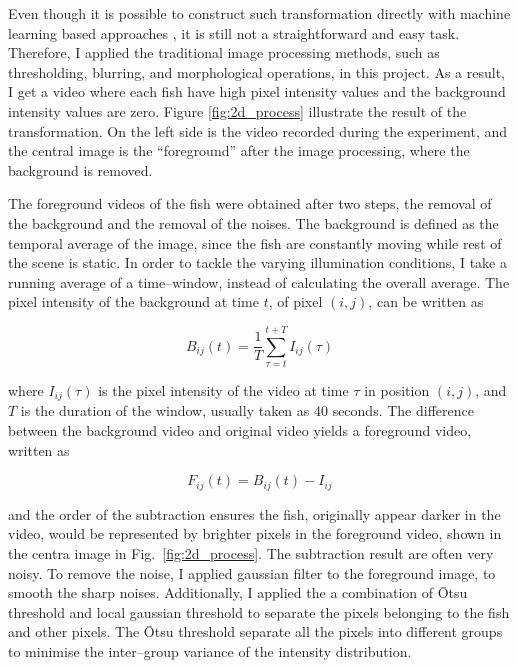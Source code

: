 \documentclass[11pt,twoside]{report}
\begin{document}
Even though it is possible to construct such transformation directly with machine learning based approaches \cite{newby2018}, it is still not a straightforward and easy task.
Therefore, I applied the traditional image processing methods, such as thresholding, blurring, and morphological operations, in this project.
As a result, I get a video where each fish have high pixel intensity values and the background intensity values are zero. Figure \ref{fig:2d_process} illustrate the result of the transformation. On the left side is the video recorded during the experiment, and the central image is the ``foreground'' after the image processing, where the background is removed.

The foreground videos of the fish were obtained after two  steps, the removal of the background and the removal of the noises. 
The background is defined as the temporal average of the image, since the fish are constantly moving while rest of the scene is static. In order to tackle the varying illumination conditions, I take a running average of a time--window, instead of calculating the overall average. The pixel intensity of the background at time $t$, of pixel $(i, j)$, can be written as

\begin{equation}
	B_{ij}(t) = \frac{1}{T} \sum_{\tau=t}^{t+T}{I_{ij}(\tau)}
\label{eqBG}
\end{equation}

\noindent where $I_{ij}(\tau)$ is the pixel intensity of the video at time $\tau$ in position $(i, j)$, and $T$ is the duration of the window, usually taken as 40 seconds. The difference between the background video and original video yields a foreground video, written as

\begin{equation}
	F_{ij}(t) = B_{ij}(t) - I_{ij}
\label{eqFG}
\end{equation}

\noindent and the order of the subtraction ensures the fish, originally appear darker in the video, would be represented by brighter pixels in the foreground video, shown in the centra image in Fig.\ \ref{fig:2d_process}. The subtraction result are often very noisy. To remove the noise, I applied gaussian filter to the foreground image, to smooth the sharp noises. Additionally, I applied the a combination of Ōtsu threshold and local gaussian threshold to separate the pixels belonging to the fish and other pixels. The Ōtsu threshold separate all the pixels into different groups to minimise the inter--group variance of the intensity distribution.
\end{document}
